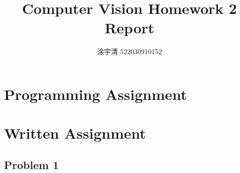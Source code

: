 \documentclass[bwprint]{gmcmthesis}
\title{Computer Vision Homework 2 Report}
\author{涂宇清 522030910152}
\date{}
\numberwithin{figure}{section}
\begin{document}
\setlength{\parskip}{10pt}
\baselineskip
\maketitle

\section{Programming Assignment}

\section{Written Assignment}
\subsection{Problem 1}
\end{document}
